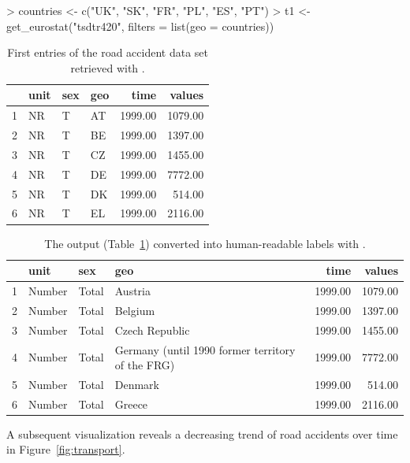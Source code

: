 \begin{example}
> countries <- c("UK", "SK", "FR", "PL", "ES", "PT")
> t1 <- get_eurostat("tsdtr420", filters = list(geo = countries)) 
\end{example}


\begin{table}[ht]
\centering
\begin{tabular}{rlllrr}
\toprule
  \hline
 & unit & sex & geo & time & values \\ 
  \hline
1 & NR & T & AT & 1999.00 & 1079.00 \\ 
  2 & NR & T & BE & 1999.00 & 1397.00 \\ 
  3 & NR & T & CZ & 1999.00 & 1455.00 \\ 
  4 & NR & T & DE & 1999.00 & 7772.00 \\ 
  5 & NR & T & DK & 1999.00 & 514.00 \\ 
  6 & NR & T & EL & 1999.00 & 2116.00 \\ 
   \hline
\bottomrule   
\end{tabular}
\caption{First entries of the road accident data set retrieved with .}
\label{tab:getdatatable}
\end{table}


\begin{table}[ht]
\centering
\begin{tabular}{rlllrr}
\toprule
  \hline
 & unit & sex & geo & time & values \\ 
  \hline
1 & Number & Total & Austria & 1999.00 & 1079.00 \\ 
  2 & Number & Total & Belgium & 1999.00 & 1397.00 \\ 
  3 & Number & Total & Czech Republic & 1999.00 & 1455.00 \\ 
  4 & Number & Total & Germany (until 1990 former territory of the FRG) & 1999.00 & 7772.00 \\ 
  5 & Number & Total & Denmark & 1999.00 & 514.00 \\ 
  6 & Number & Total & Greece & 1999.00 & 2116.00 \\ 
   \hline
\bottomrule      
\end{tabular}
\caption{The  output (Table~\ref{tab:getdatatable}) converted into human-readable labels with .}
\label{tab:getdatatable2}
\end{table}



A subsequent visualization reveals a decreasing trend of road accidents over time in Figure~\ref{fig:transport}.

